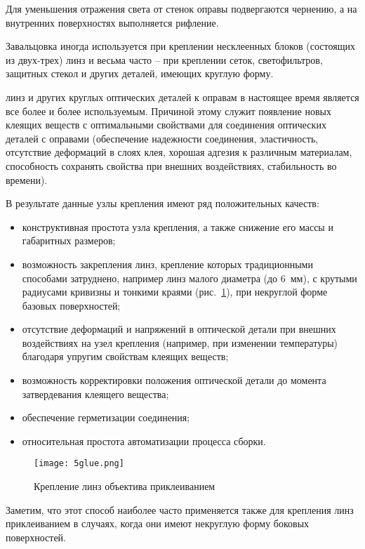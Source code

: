 Для уменьшения отражения света от стенок оправы подвергаются чернению, а на внутренних поверхностях выполняется рифление.

Завальцовка иногда используется при креплении несклеенных блоков (состоящих из двух-трех) линз и весьма часто -- при креплении сеток, светофильтров, защитных стекол и других деталей, имеющих круглую форму.

  линз и других круглых оптических деталей к оправам в настоящее время является все более и более используемым. 
Причиной этому служит появление новых клеящих веществ с оптимальными свойствами для соединения оптических деталей с оправами (обеспечение надежности соединения, эластичность, отсутствие деформаций в слоях клея, хорошая адгезия к различным материалам, способность сохранять свойства при внешних воздействиях, стабильность во времени).

В результате данные узлы крепления имеют ряд положительных качеств:
\begin{itemize}
	\item конструктивная простота узла крепления, а также снижение его массы и габаритных размеров;
	\item возможность закрепления линз, крепление которых традиционными способами затруднено, например линз малого диаметра (до 6~мм), с крутыми радиусами кривизны и тонкими краями (рис.~\ref{pic:5glue}), при некруглой форме базовых поверхностей;
	\item отсутствие деформаций и напряжений в оптической детали при внешних воздействиях на узел крепления (например, при изменении температуры) благодаря упругим свойствам клеящих веществ;
	\item возможность корректировки положения оптической детали до момента затвердевания клеящего вещества;
	\item обеспечение герметизации соединения;
	\item относительная простота автоматизации процесса сборки.
\end{itemize}

\begin{figure}[h!]
	\begin{center}
		\texttt{[image: 5glue.png]}
		\caption{Крепление линз объектива приклеиванием}
		\label{pic:5glue}
	\end{center}
\end{figure}

Заметим, что этот способ наиболее часто применяется также для крепления линз приклеиванием в случаях, когда они имеют некруглую форму боковых поверхностей.

